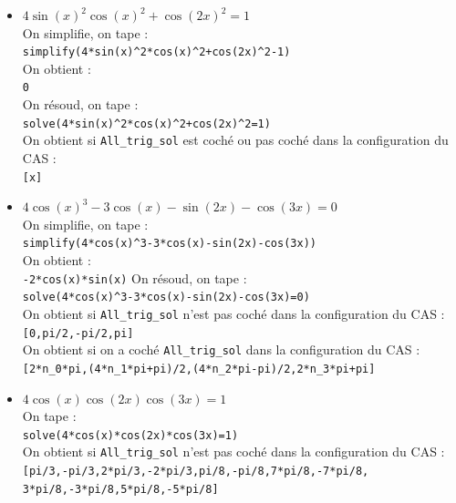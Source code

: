 \documentclass[a4paper,11pt]{book}
\begin{document}
\begin{itemize}
On obtient :\\
Attention! Extension algébrique non implémentée pour les poly [1,0,0,0,-3,-1]\\
{\tt [-1.2146480427,0.8029510011728015413e-1+1.328355109820654077*i,\\
0.8029510011728015413e-1-1.328355109820654077*i,\\
-0.3347341419433526871,1.388791984407254183]}
\item $4\sin(x)^2\cos(x)^2+\cos(2x)^2=1$\\
On simplifie, on tape :\\
{\tt simplify(4*sin(x)\verb|^|2*cos(x)\verb|^|2+cos(2x)\verb|^|2-1)}\\
On obtient :\\
{\tt 0}\\
On r\'esoud, on tape :\\
{\tt solve(4*sin(x)\verb|^|2*cos(x)\verb|^|2+cos(2x)\verb|^|2=1)}\\
On obtient si {\tt All\_trig\_sol} est coch\'e ou pas coch\'e dans la configuration du CAS :\\
{\tt [x]}
\item $4\cos(x)^3-3\cos(x)-\sin(2x)-\cos(3x)=0$\\
On simplifie, on tape :\\
{\tt simplify(4*cos(x)\verb|^|3-3*cos(x)-sin(2x)-cos(3x))}\\
On obtient :\\
{\tt -2*cos(x)*sin(x)}
On r\'esoud, on tape :\\
{\tt solve(4*cos(x)\verb|^|3-3*cos(x)-sin(2x)-cos(3x)=0)}\\
On obtient si {\tt All\_trig\_sol} n'est pas coch\'e dans la configuration du CAS :\\
{\tt [0,pi/2,-pi/2,pi]}\\
On obtient si on a coch\'e {\tt All\_trig\_sol} dans la configuration du CAS :\\
{\tt [2*n\_0*pi,(4*n\_1*pi+pi)/2,(4*n\_2*pi-pi)/2,2*n\_3*pi+pi]}
\item $4\cos(x)\cos(2x)\cos(3x)=1$\\
On tape :\\
{\tt solve(4*cos(x)*cos(2x)*cos(3x)=1)}\\
On obtient si {\tt All\_trig\_sol} n'est pas coch\'e dans la configuration du CAS :\\
{\tt [pi/3,-pi/3,2*pi/3,-2*pi/3,pi/8,-pi/8,7*pi/8,-7*pi/8,\\
3*pi/8,-3*pi/8,5*pi/8,-5*pi/8]}\\

\end{itemize}
\end{document}
